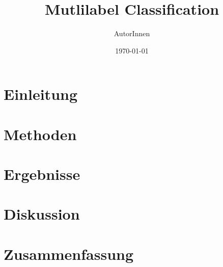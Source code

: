 \documentclass{scrartcl}
\title{Mutlilabel Classification}
\author{AutorInnen}
\date{\today}
\begin{document}
\maketitle

\begin{abstract}
    \lipsum[11]
\end{abstract}

\tableofcontents

\section{Einleitung}
\lipsum[1]
\section{Methoden}
\lipsum[2]
\section{Ergebnisse}
\lipsum[3]
\section{Diskussion}
\lipsum[4]
\section{Zusammenfassung}
\lipsum[5]

\nocite{*}



\end{document}
